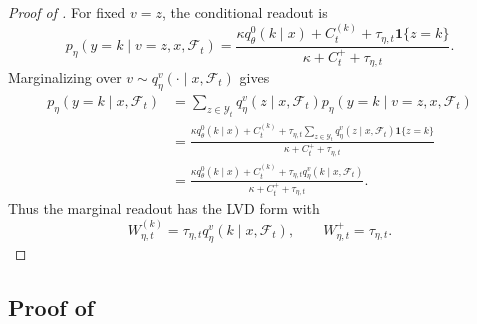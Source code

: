 \begin{proof}[Proof of ]
For fixed $v=z$, the conditional readout is
\[
    p_\eta(y=k\mid v=z,x,\mathcal F_t)
    =
    \frac{
    \kappa q_\theta^0(k\mid x)+C_t^{(k)}
    +\tau_{\eta,t}\mathbf 1\{z=k\}
    }{
    \kappa+C_t^+ +\tau_{\eta,t}
    }.
\]
Marginalizing over $v\sim q_\eta^v(\cdot\mid x,\mathcal F_t)$ gives
\[
\begin{aligned}
    p_\eta(y=k\mid x,\mathcal F_t)
    &=
    \sum_{z\in\mathcal Y_t}
    q_\eta^v(z\mid x,\mathcal F_t)
    p_\eta(y=k\mid v=z,x,\mathcal F_t)\\
    &=
    \frac{
    \kappa q_\theta^0(k\mid x)+C_t^{(k)}
    +\tau_{\eta,t}
    \sum_{z\in\mathcal Y_t}
    q_\eta^v(z\mid x,\mathcal F_t)\mathbf 1\{z=k\}
    }{
    \kappa+C_t^+ +\tau_{\eta,t}
    }\\
    &=
    \frac{
    \kappa q_\theta^0(k\mid x)+C_t^{(k)}
    +\tau_{\eta,t}q_\eta^v(k\mid x,\mathcal F_t)
    }{
    \kappa+C_t^+ +\tau_{\eta,t}
    }.
\end{aligned}
\]
Thus the marginal readout has the LVD form with
\[
    W_{\eta,t}^{(k)}=\tau_{\eta,t}q_\eta^v(k\mid x,\mathcal F_t),
    \qquad
    W_{\eta,t}^+=\tau_{\eta,t}.
\]
\end{proof}

\subsection{Proof of }
\label{app:proof_verification_directed_drift}

